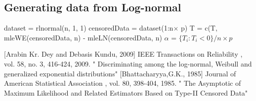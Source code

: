 \documentclass[twoside]{article}
\begin{document}
\begin{multicols}{2}
\subsection{Generating data from Log-normal}
\begin{algorithm}[H]
  dataset = rlnormal(n, 1, 1)\;
  censoredData = dataset(1:n$\times$ p)\;
  T = c(T, mleWE(censoredData, n) - mleLN(censoredData, n)\;
  $\alpha$ = $\{T_i : T_i < 0\}/n\times p$\;
\end{algorithm}









\begin{thebibliography}{99} %

[Arabin Kr. Dey and Debasis Kundu, 2009]{}
 IEEE Transactions on Reliability , vol. 58, no. 3, 416-424, 2009. 
\newblock  " Discriminating among the log-normal, Weibull and generalized exponential distributions"
[Bhattacharyya,G.K., 1985]{}
 Journal of American Statistical Association , vol. 80, 398-404, 1985. 
\newblock  " The Asymptotic of Maximum Likelihood and Related Estimators Based on Type-II Censored Data"
 
\end{thebibliography}


\end{multicols}
\end{document}

